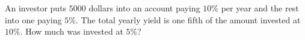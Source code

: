An investor puts $5000$ dollars into an account paying $10\%$ per year and the rest into one paying $5\%$. The total yearly yield is one fifth of the amount invested at $10\%$. How much was invested at $5\%$?
